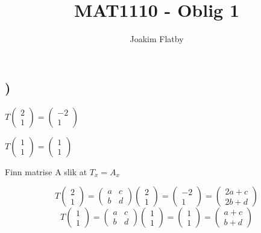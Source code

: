 \documentclass[a4paper,10pt,norsk]{article}
\title{MAT1110 - Oblig 1}
\author{Joakim Flatby}
\begin{document}
\maketitle
\section{}

\subsection{)}

$T\left(\begin{matrix}2\\1\end{matrix}\right) = \left(\begin{matrix}-2\\1\end{matrix}\right)$

$T\left(\begin{matrix}1\\1\end{matrix}\right) = \left(\begin{matrix}1\\1\end{matrix}\right)$

Finn matrise A slik at $T_{x} = A_{x}$

\[T\left(\begin{matrix}2\\1\end{matrix}\right) = \left(\begin{matrix}a&c\\b&d\end{matrix}\right)\left(\begin{matrix}2\\1\end{matrix}\right) = \left(\begin{matrix}-2\\1\end{matrix}\right) = \left(\begin{matrix}2a + c\\2b + d\end{matrix}\right)\]
\[T\left(\begin{matrix}1\\1\end{matrix}\right) = \left(\begin{matrix}a&c\\b&d\end{matrix}\right)\left(\begin{matrix}1\\1\end{matrix}\right) = \left(\begin{matrix}1\\1\end{matrix}\right) = \left(\begin{matrix}a + c\\b + d\end{matrix}\right)\]
\end{document}
